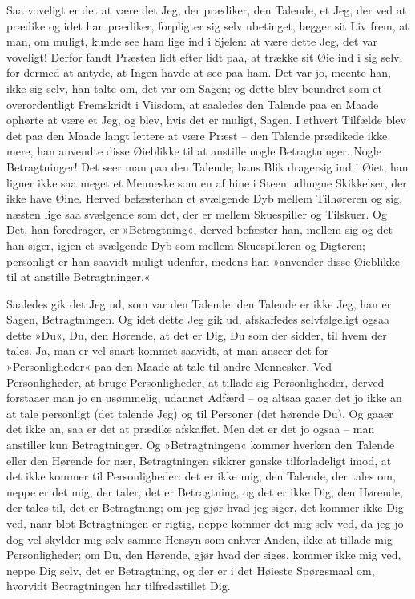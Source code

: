 \documentclass[12pt,a4paper]{article}
\begin{document}
Saa voveligt er det at være det Jeg, der prædiker, den Talende, et Jeg, der ved at prædike og idet han prædiker, forpligter sig selv ubetinget, lægger sit Liv frem, at man, om muligt, kunde see ham lige ind i Sjelen: at være dette Jeg, det var voveligt! Derfor fandt Præsten lidt efter lidt paa, at trække sit Øie ind i sig selv, for dermed at antyde, at Ingen havde at see paa ham. Det var jo, meente han, ikke sig selv, han talte om, det var om Sagen; og dette blev beundret som et overordentligt Fremskridt i Viisdom, at saaledes den Talende paa en Maade ophørte at være et Jeg, og blev, hvis det er muligt, Sagen. I ethvert Tilfælde blev det paa den Maade langt lettere at være Præst – den Talende prædikede ikke mere, han anvendte disse Øieblikke til at anstille nogle Betragtninger. Nogle Betragtninger! Det seer man paa den Talende; hans Blik dragersig ind i Øiet, han ligner ikke saa meget et Menneske som en af hine i Steen udhugne Skikkelser, der ikke have Øine. Herved befæsterhan et svælgende Dyb mellem Tilhøreren og sig, næsten lige saa svælgende som det, der er mellem Skuespiller og Tilskuer. Og Det, han foredrager, er »Betragtning«, derved befæster han, mellem sig og det han siger, igjen et svælgende Dyb som mellem Skuespilleren og Digteren; personligt er han saavidt muligt udenfor, medens han »anvender disse Øieblikke til at anstille Betragtninger.«

Saaledes gik det Jeg ud, som var den Talende; den Talende er ikke Jeg, han er Sagen, Betragtningen. Og idet dette Jeg gik ud, afskaffedes selvfølgeligt ogsaa dette »Du«, Du, den Hørende, at det er Dig, Du som der sidder, til hvem der tales. Ja, man er vel snart kommet saavidt, at man anseer det for »Personligheder« paa den Maade at tale til andre Mennesker. Ved Personligheder, at bruge Personligheder, at tillade sig Personligheder, derved forstaaer man jo en usømmelig, udannet Adfærd – og altsaa gaaer det jo ikke an at tale personligt (det talende Jeg) og til Personer (det hørende Du). Og gaaer det ikke an, saa er det at prædike afskaffet. Men det er det jo ogsaa – man anstiller kun Betragtninger. Og »Betragtningen« kommer hverken den Talende eller den Hørende for nær, Betragtningen sikkrer ganske tilforladeligt imod, at det ikke kommer til Personligheder: det er ikke mig, den Talende, der tales om, neppe er det mig, der taler, det er Betragtning, og det er ikke Dig, den Hørende, der tales til, det er Betragtning; om jeg gjør hvad jeg siger, det kommer ikke Dig ved, naar blot Betragtningen er rigtig, neppe kommer det mig selv ved, da jeg jo dog vel skylder mig selv samme Hensyn som enhver Anden, ikke at tillade mig Personligheder; om Du, den Hørende, gjør hvad der siges, kommer ikke mig ved, neppe Dig selv, det er Betragtning, og der er i det Høieste Spørgsmaal om, hvorvidt Betragtningen har tilfredsstillet Dig.
\end{document}
